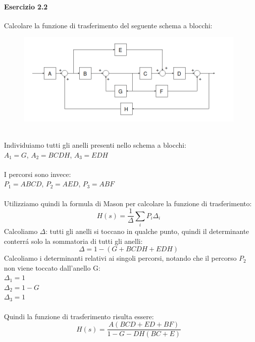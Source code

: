 \documentclass[12pt,a4paper]{article}
\begin{document}
	\paragraph*{Esercizio 2.2}
	Calcolare la funzione di trasferimento del seguente schema a blocchi:
	\begin{figure}[h!]
		\centering
		\includegraphics[scale=0.5]{./images/schema22.png}
	\end{figure}
    \\
	Individuiamo tutti gli anelli presenti nello schema a blocchi:\\
	$A_1 = G$, \quad $A_2 = BCDH$, \quad $A_3 = EDH$\\ \\
	I percorsi sono invece:\\
	$P_1 = ABCD$, \quad $P_2 = AED$, \quad $P_3 = ABF$\\ \\
	Utilizziamo quindi la formula di Mason per calcolare la funzione di trasferimento:
	\[
		H(s) = \frac{1}{\Delta}\sum_i P_i \Delta_i
	\]
	Calcoliamo $\Delta$: tutti gli anelli si toccano in qualche punto, quindi il determinante conterr\'a solo la sommatoria di tutti gli anelli:
	\[
		\Delta = 1 - (G + BCDH + EDH)
	\]
	Calcoliamo i determinanti relativi ai singoli percorsi, notando che il percorso $P_2$ non viene toccato dall'anello G:\\
	$\Delta_1 = 1$\\
	$\Delta_2 = 1-G$ \\
	$\Delta_3 = 1$ \\ \\
	Quindi la funzione di trasferimento risulta essere:
	\[
		H(s) = \frac{A(BCD + ED + BF)}{1 - G - DH(BC + E)}
	\]
	\newpage
\end{document}
